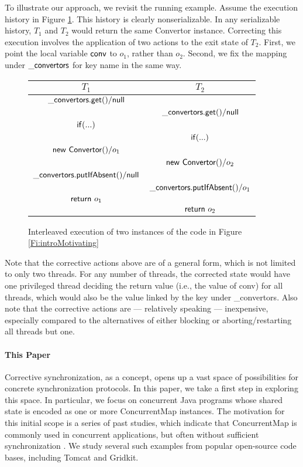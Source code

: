 To illustrate our approach, we revisit the running example. Assume the execution history in Figure \ref{Fi:motivatingInterleaving}.
This history is clearly nonserializable. In any serializable history, $T_1$ and $T_2$ would return the same {\sf Convertor} instance. Correcting this execution involves the application of two actions to the exit state of $T_2$. First, we point the local variable ${\sf conv}$ to $o_1$, rather than $o_2$. Second, we fix the mapping under ${\sf \_convertors}$ for key {\sf name} in the same way.

\begin{figure}
	\begin{center}
		\begin{tabular}{c||c}
			$T_1$ & $T_2$ \\
			\hline
			${\sf \_convertors.get()} / {\sf null}$ &  \\
			& ${\sf \_convertors.get()} / {\sf null}$ \\
			${\sf if (...)}$ 								   &							\\
			& ${\sf if (...)}$ \\
			${\sf new\ Convertor()} / o_1$		& \\
			& ${\sf new\ Convertor()} / o_2$ \\
			${\sf \_convertors.putIfAbsent()} / {\sf null}$ &  \\
			& 		${\sf \_convertors.putIfAbsent()} / o_1$ \\
			${\sf return}\ o_1$ & \\
			& ${\sf return}\ o_2$ \\
			\end{tabular}
			\end{center}
	\caption{\label{Fi:motivatingInterleaving}Interleaved execution of two instances of the code in Figure \ref{Fi:introMotivating}}
\end{figure}

Note that the corrective actions above are of a general form, which is not limited to only two threads. For any number of threads, the corrected state would have one privileged thread deciding the return value (i.e., the value of {\sf conv}) for all threads, which would also be the value linked by the key under {\sf \_convertors}. Also note that the corrective actions are --- relatively speaking --- inexpensive, especially compared to the alternatives of either blocking or aborting/restarting all threads but one.

\paragraph{This Paper} Corrective synchronization, as a concept, opens up a vast space of possibilities for concrete synchronization protocols. In this paper, we take a first step in exploring this space. In particular, we focus on concurrent Java programs whose shared state is encoded as one or more {\sf ConcurrentMap} instances. The motivation for this initial scope is a series of past studies, which indicate that {\sf ConcurrentMap} is commonly used in concurrent applications, but often without sufficient synchronization \cite{oopsla/ShachamBASVY11,issta/ShachamYGABSV14}. We study several such examples from popular open-source code bases, including Tomcat and Gridkit.

